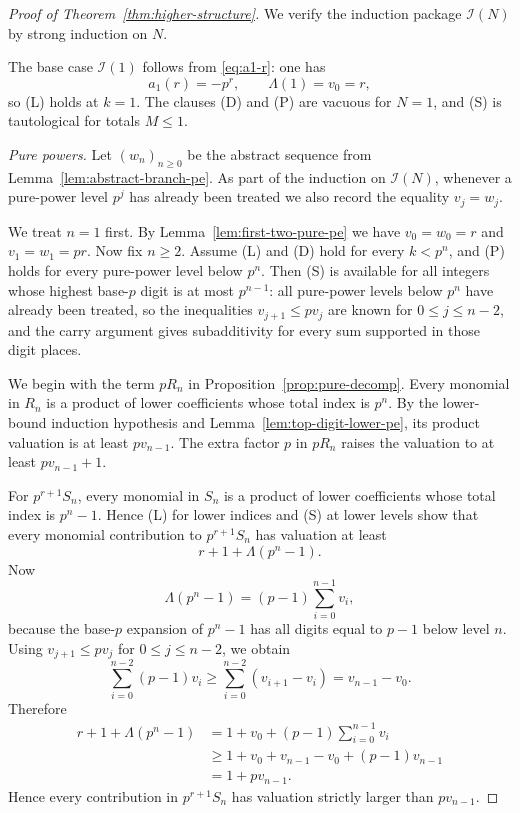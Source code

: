 \documentclass[11pt]{amsart}
\numberwithin{equation}{section}
\begin{document}
\begin{proof}[Proof of Theorem~\ref{thm:higher-structure}]
We verify the induction package $\mathcal I(N)$ by strong induction on $N$.

The base case $\mathcal I(1)$ follows from \eqref{eq:a1-r}: one has
\[
        a_1(r)=-p^r,
        \qquad
        \Lambda(1)=v_0=r,
\]
so (L) holds at $k=1$.  The clauses (D) and (P) are vacuous for $N=1$, and (S) is tautological for totals $M\le1$.

\smallskip
\noindent\emph{Pure powers.}
Let $(w_n)_{n\ge0}$ be the abstract sequence from Lemma~\ref{lem:abstract-branch-pe}.  As part of the induction on $\mathcal I(N)$, whenever a pure-power level $p^j$ has already been treated we also record the equality $v_j=w_j$.

We treat $n=1$ first.  By Lemma~\ref{lem:first-two-pure-pe} we have $v_0=w_0=r$ and $v_1=w_1=pr$.  Now fix $n\ge2$.  Assume (L) and (D) hold for every $k<p^n$, and (P) holds for every pure-power level below $p^n$.  Then (S) is available for all integers whose highest base-$p$ digit is at most $p^{n-1}$: all pure-power levels below $p^n$ have already been treated, so the inequalities $v_{j+1}\le p v_j$ are known for $0\le j\le n-2$, and the carry argument gives subadditivity for every sum supported in those digit places.

We begin with the term $pR_n$ in Proposition~\ref{prop:pure-decomp}.  Every monomial in $R_n$ is a product of lower coefficients whose total index is $p^n$.  By the lower-bound induction hypothesis and Lemma~\ref{lem:top-digit-lower-pe}, its product valuation is at least $p v_{n-1}$.  The extra factor $p$ in $pR_n$ raises the valuation to at least $p v_{n-1}+1$.

For $p^{r+1}S_n$, every monomial in $S_n$ is a product of lower coefficients whose total index is $p^n-1$.  Hence (L) for lower indices and (S) at lower levels show that every monomial contribution to $p^{r+1}S_n$ has valuation at least
\[
        r+1+\Lambda(p^n-1).
\]
Now
\[
        \Lambda(p^n-1)=(p-1)\sum_{i=0}^{n-1}v_i,
\]
because the base-$p$ expansion of $p^n-1$ has all digits equal to $p-1$ below level $n$.  Using $v_{j+1}\le p v_j$ for $0\le j\le n-2$, we obtain
\[
        \sum_{i=0}^{n-2}(p-1)v_i\ge \sum_{i=0}^{n-2}(v_{i+1}-v_i)=v_{n-1}-v_0.
\]
Therefore
\[
\begin{aligned}
        r+1+\Lambda(p^n-1)
        &=1+v_0+(p-1)\sum_{i=0}^{n-1}v_i\\
        &\ge 1+v_0+v_{n-1}-v_0+(p-1)v_{n-1}\\
        &=1+p v_{n-1}.
\end{aligned}
\]
Hence every contribution in $p^{r+1}S_n$ has valuation strictly larger than $p v_{n-1}$.


\end{proof}
\end{document}
